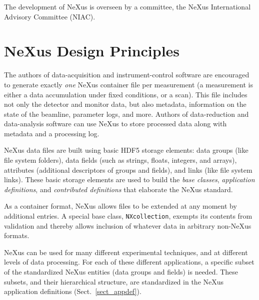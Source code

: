 \documentclass[%
 aip,
rsi,
 amsmath,amssymb,
 reprint,%
]{revtex4-1}
\begin{document}
The development of NeXus is overseen by a committee, the NeXus International Advisory Committee (NIAC).

\section{NeXus Design Principles}

The authors of data-acquisition and instrument-control software are encouraged to generate exactly \emph{one} NeXus container file per measurement
(a measurement is either a data accumulation under fixed conditions,
or a scan).
This file includes not only the detector and monitor data,
but also metadata, information on the state of the beamline, parameter logs, and more.
Authors of data-reduction and data-analysis software can use NeXus to
store processed data along with metadata and a processing log.

NeXus data files are built using basic HDF5 storage elements: 
data groups (like file system folders), 
data fields (such as strings, floats, integers, and arrays), 
attributes (additional descriptors of groups and fields), 
and links (like file system links).  These basic storage elements are used to
build the \emph{base classes}, \emph{application definitions},
and \emph{contributed definitions} that elaborate the NeXus standard.

As a container format, NeXus allows files to be extended at any moment by
additional entries.
A special base class, \texttt{NXcollection}, exempts its contents from validation
and thereby allows inclusion of whatever data in arbitrary non-NeXus formats.

NeXus can be used for many different experimental techniques,
and at different levels of data processing.
For each of these different applications,
a specific subset of the standardized NeXus entities 
(data groups and fields) is needed.
These subsets, and their hierarchical structure, are standardized
in the NeXus application definitions (Sect.~\ref{sect_appdef}).
\end{document}
